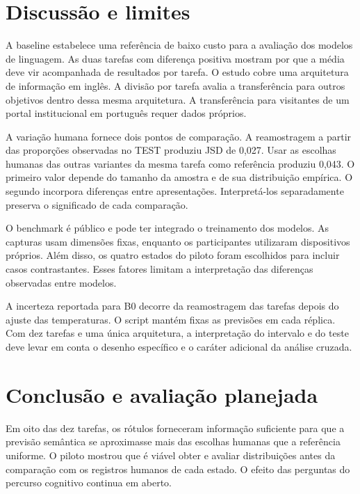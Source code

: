 \documentclass[12pt]{article}
\begin{document}
\section{Discussão e limites}

A baseline estabelece uma referência de baixo custo para a avaliação dos modelos de linguagem. As duas tarefas com diferença positiva mostram por que a média deve vir acompanhada de resultados por tarefa. O estudo cobre uma arquitetura de informação em inglês. A divisão por tarefa avalia a transferência para outros objetivos dentro dessa mesma arquitetura. A transferência para visitantes de um portal institucional em português requer dados próprios.

A variação humana fornece dois pontos de comparação. A reamostragem a partir das proporções observadas no TEST produziu JSD de 0,027. Usar as escolhas humanas das outras variantes da mesma tarefa como referência produziu 0,043. O primeiro valor depende do tamanho da amostra e de sua distribuição empírica. O segundo incorpora diferenças entre apresentações. Interpretá-los separadamente preserva o significado de cada comparação.

O benchmark é público e pode ter integrado o treinamento dos modelos. As capturas usam dimensões fixas, enquanto os participantes utilizaram dispositivos próprios. Além disso, os quatro estados do piloto foram escolhidos para incluir casos contrastantes. Esses fatores limitam a interpretação das diferenças observadas entre modelos.

A incerteza reportada para B0 decorre da reamostragem das tarefas depois do ajuste das temperaturas. O script mantém fixas as previsões em cada réplica. Com dez tarefas e uma única arquitetura, a interpretação do intervalo e do teste deve levar em conta o desenho específico e o caráter adicional da análise cruzada.

\section{Conclusão e avaliação planejada}

Em oito das dez tarefas, os rótulos forneceram informação suficiente para que a previsão semântica se aproximasse mais das escolhas humanas que a referência uniforme. O piloto mostrou que é viável obter e avaliar distribuições antes da comparação com os registros humanos de cada estado. O efeito das perguntas do percurso cognitivo continua em aberto.
\end{document}
